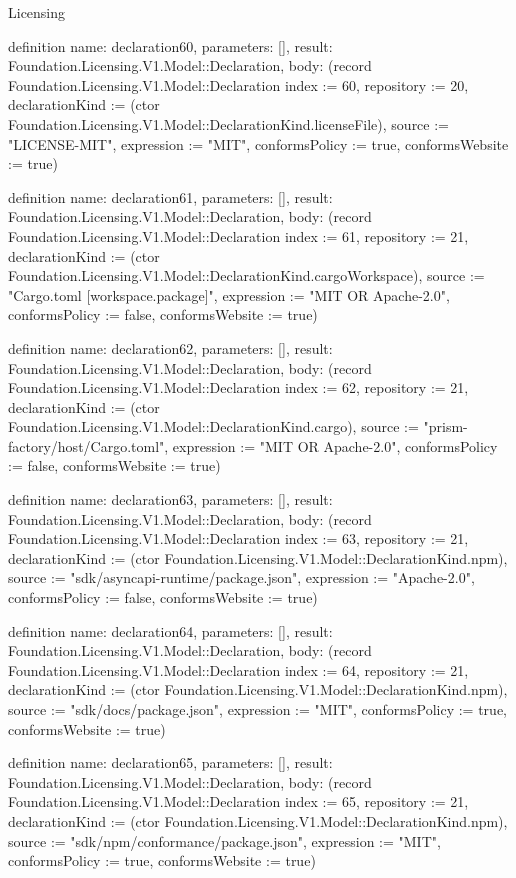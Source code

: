 \begin{lexlean}{Licensing}
\begin{semanticmodule}
definition{
  name: declaration60,
  parameters: [],
  result: Foundation.Licensing.V1.Model::Declaration,
  body: (record Foundation.Licensing.V1.Model::Declaration {index := 60, repository := 20, declarationKind := (ctor Foundation.Licensing.V1.Model::DeclarationKind.licenseFile), source := "LICENSE-MIT", expression := "MIT", conformsPolicy := true, conformsWebsite := true})
}

definition{
  name: declaration61,
  parameters: [],
  result: Foundation.Licensing.V1.Model::Declaration,
  body: (record Foundation.Licensing.V1.Model::Declaration {index := 61, repository := 21, declarationKind := (ctor Foundation.Licensing.V1.Model::DeclarationKind.cargoWorkspace), source := "Cargo.toml [workspace.package]", expression := "MIT OR Apache-2.0", conformsPolicy := false, conformsWebsite := true})
}

definition{
  name: declaration62,
  parameters: [],
  result: Foundation.Licensing.V1.Model::Declaration,
  body: (record Foundation.Licensing.V1.Model::Declaration {index := 62, repository := 21, declarationKind := (ctor Foundation.Licensing.V1.Model::DeclarationKind.cargo), source := "prism-factory/host/Cargo.toml", expression := "MIT OR Apache-2.0", conformsPolicy := false, conformsWebsite := true})
}

definition{
  name: declaration63,
  parameters: [],
  result: Foundation.Licensing.V1.Model::Declaration,
  body: (record Foundation.Licensing.V1.Model::Declaration {index := 63, repository := 21, declarationKind := (ctor Foundation.Licensing.V1.Model::DeclarationKind.npm), source := "sdk/asyncapi-runtime/package.json", expression := "Apache-2.0", conformsPolicy := false, conformsWebsite := true})
}

definition{
  name: declaration64,
  parameters: [],
  result: Foundation.Licensing.V1.Model::Declaration,
  body: (record Foundation.Licensing.V1.Model::Declaration {index := 64, repository := 21, declarationKind := (ctor Foundation.Licensing.V1.Model::DeclarationKind.npm), source := "sdk/docs/package.json", expression := "MIT", conformsPolicy := true, conformsWebsite := true})
}

definition{
  name: declaration65,
  parameters: [],
  result: Foundation.Licensing.V1.Model::Declaration,
  body: (record Foundation.Licensing.V1.Model::Declaration {index := 65, repository := 21, declarationKind := (ctor Foundation.Licensing.V1.Model::DeclarationKind.npm), source := "sdk/npm/conformance/package.json", expression := "MIT", conformsPolicy := true, conformsWebsite := true})
}


\end{semanticmodule}
\end{lexlean}
